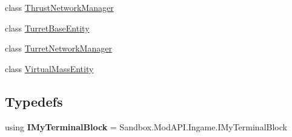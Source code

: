 \begin{DoxyCompactItemize}
class \hyperlink{class_s_e_mod_a_p_i_internal_1_1_a_p_i_1_1_entity_1_1_sector_1_1_sector_object_1_1_cube_grid_1_1160ab026af0740b86534e6935a74fff2}{Thrust\+Network\+Manager}
\item 
class \hyperlink{class_s_e_mod_a_p_i_internal_1_1_a_p_i_1_1_entity_1_1_sector_1_1_sector_object_1_1_cube_grid_1_18bc384bbaf571fbfc8546173f456649e}{Turret\+Base\+Entity}
\item 
class \hyperlink{class_s_e_mod_a_p_i_internal_1_1_a_p_i_1_1_entity_1_1_sector_1_1_sector_object_1_1_cube_grid_1_1b51091c5d07b0b548101717ac1a5d6ae}{Turret\+Network\+Manager}
\item 
class \hyperlink{class_s_e_mod_a_p_i_internal_1_1_a_p_i_1_1_entity_1_1_sector_1_1_sector_object_1_1_cube_grid_1_1c2886c01035f755cea14c86b16c0a112}{Virtual\+Mass\+Entity}
\end{DoxyCompactItemize}
\subsection*{Typedefs}
\begin{DoxyCompactItemize}
\item 
\hypertarget{namespace_s_e_mod_a_p_i_internal_1_1_a_p_i_1_1_entity_1_1_sector_1_1_sector_object_1_1_cube_grid_1_1_cube_block_a859aa3465102c99438b6553207de7a55}{}using {\bfseries I\+My\+Terminal\+Block} = Sandbox.\+Mod\+A\+P\+I.\+Ingame.\+I\+My\+Terminal\+Block\label{namespace_s_e_mod_a_p_i_internal_1_1_a_p_i_1_1_entity_1_1_sector_1_1_sector_object_1_1_cube_grid_1_1_cube_block_a859aa3465102c99438b6553207de7a55}

\end{DoxyCompactItemize}
